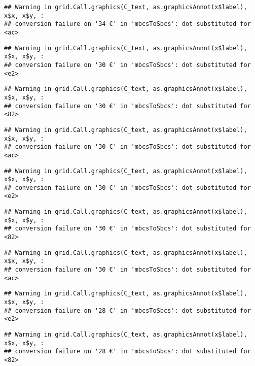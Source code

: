 \documentclass[
]{article}
\begin{document}
\begin{verbatim}
## Warning in grid.Call.graphics(C_text, as.graphicsAnnot(x$label), x$x, x$y, :
## conversion failure on '34 €' in 'mbcsToSbcs': dot substituted for <ac>
\end{verbatim}

\begin{verbatim}
## Warning in grid.Call.graphics(C_text, as.graphicsAnnot(x$label), x$x, x$y, :
## conversion failure on '30 €' in 'mbcsToSbcs': dot substituted for <e2>
\end{verbatim}

\begin{verbatim}
## Warning in grid.Call.graphics(C_text, as.graphicsAnnot(x$label), x$x, x$y, :
## conversion failure on '30 €' in 'mbcsToSbcs': dot substituted for <82>
\end{verbatim}

\begin{verbatim}
## Warning in grid.Call.graphics(C_text, as.graphicsAnnot(x$label), x$x, x$y, :
## conversion failure on '30 €' in 'mbcsToSbcs': dot substituted for <ac>
\end{verbatim}

\begin{verbatim}
## Warning in grid.Call.graphics(C_text, as.graphicsAnnot(x$label), x$x, x$y, :
## conversion failure on '30 €' in 'mbcsToSbcs': dot substituted for <e2>
\end{verbatim}

\begin{verbatim}
## Warning in grid.Call.graphics(C_text, as.graphicsAnnot(x$label), x$x, x$y, :
## conversion failure on '30 €' in 'mbcsToSbcs': dot substituted for <82>
\end{verbatim}

\begin{verbatim}
## Warning in grid.Call.graphics(C_text, as.graphicsAnnot(x$label), x$x, x$y, :
## conversion failure on '30 €' in 'mbcsToSbcs': dot substituted for <ac>
\end{verbatim}

\begin{verbatim}
## Warning in grid.Call.graphics(C_text, as.graphicsAnnot(x$label), x$x, x$y, :
## conversion failure on '28 €' in 'mbcsToSbcs': dot substituted for <e2>
\end{verbatim}

\begin{verbatim}
## Warning in grid.Call.graphics(C_text, as.graphicsAnnot(x$label), x$x, x$y, :
## conversion failure on '28 €' in 'mbcsToSbcs': dot substituted for <82>
\end{verbatim}
\end{document}
